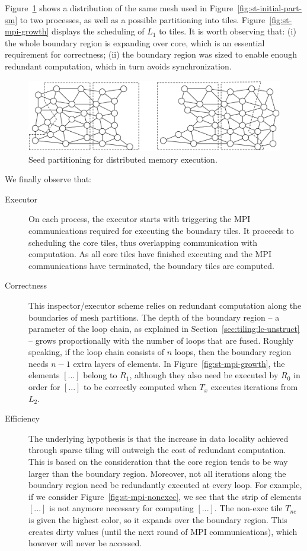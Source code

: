 Figure~\ref{fig:st-mpi-init} shows a distribution of the same mesh used in Figure~\ref{fig:st-initial-part-sm} to two processes, as well as a possible partitioning into tiles. Figure~\ref{fig:st-mpi-growth} displays the scheduling of $L_1$ to tiles. It is worth observing that: (i) the whole boundary region is expanding over core, which is an essential requirement for correctness; (ii) the boundary region was sized to enable enough redundant computation, which in turn avoids synchronization.

\begin{figure}
\centering
\includegraphics[width=\textwidth]{sparsetiling/figures/base_mesh_doppio.pdf}
\caption{Seed partitioning for distributed memory execution.}
\label{fig:st-mpi-init}
\end{figure}

We finally observe that:
\begin{description}
\item[Executor] On each process, the executor starts with triggering the MPI communications required for executing the boundary tiles. It proceeds to scheduling the core tiles, thus overlapping communication with computation. As all core tiles have finished executing and the MPI communications have terminated, the boundary tiles are computed.
\item[Correctness] This inspector/executor scheme relies on redundant computation along the boundaries of mesh partitions. The depth of the boundary region -- a parameter of the loop chain, as explained in Section~\ref{sec:tiling:lc-unstruct} -- grows proportionally with the number of loops that are fused. Roughly speaking, if the loop chain consists of $n$ loops, then the boundary region needs $n-1$ extra layers of elements. In Figure~\ref{fig:st-mpi-growth}, the elements $[...]$ belong to $R_1$, although they also need be executed by $R_0$ in order for $[...]$ to be correctly computed when $T_x$ executes iterations from $L_2$.  
\item[Efficiency] The underlying hypothesis is that the increase in data locality achieved through sparse tiling will outweigh the cost of redundant computation. This is based on the consideration that the core region tends to be way larger than the boundary region. Moreover, not all iterations along the boundary region need be redundantly executed at every loop. For example, if we consider Figure~\ref{fig:st-mpi-nonexec}, we see that the strip of elements $[...]$ is not anymore necessary for computing $[...]$. The non-exec tile $T_{ne}$ is given the highest color, so it expands over the boundary region. This creates dirty values (until the next round of MPI communications), which however will never be accessed. 
\end{description}



